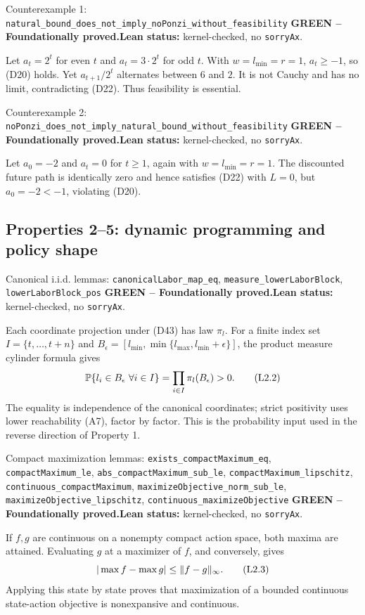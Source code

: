 \documentclass[11pt]{article}
\newcommand{\PP}{\mathbb P}
\newcommand{\leanname}[1]{\nolinkurl{#1}}
\newcommand{\eqL}[1]{\refstepcounter{equation}\tag{L#1}}
\newcommand{\formalcheck}{\textbf{Lean status:} kernel-checked, no \texttt{sorryAx}.}
\newcommand{\greenstatus}{\textcolor{proved}{\textbf{GREEN -- Foundationally proved.}}}
\begin{document}
\begin{greenbox}{Counterexample 1: \leanname{natural_bound_does_not_imply_noPonzi_without_feasibility}}
\greenstatus\quad\formalcheck

Let \(a_t=2^t\) for even \(t\) and \(a_t=3\cdot2^t\) for odd \(t\).  With
\(w=l_{\min}=r=1\), \(a_t\ge-1\), so (D20) holds.  Yet
\(a_{t+1}/2^t\) alternates between \(6\) and \(2\).  It is not Cauchy and has
no limit, contradicting (D22).  Thus feasibility is essential.
\end{greenbox}

\begin{greenbox}{Counterexample 2: \leanname{noPonzi_does_not_imply_natural_bound_without_feasibility}}
\greenstatus\quad\formalcheck

Let \(a_0=-2\) and \(a_t=0\) for \(t\ge1\), again with
\(w=l_{\min}=r=1\).  The discounted future path is identically zero and hence
satisfies (D22) with \(L=0\), but \(a_0=-2<-1\), violating (D20).
\end{greenbox}

\subsection{Properties 2--5: dynamic programming and policy shape}

\begin{greenbox}{Canonical i.i.d. lemmas: \leanname{canonicalLabor_map_eq},
\leanname{measure_lowerLaborBlock}, \leanname{lowerLaborBlock_pos}}
\greenstatus\quad\formalcheck

Each coordinate projection under (D43) has law \(\pi_l\).  For a finite index
set \(I=\{t,\ldots,t+n\}\) and
\(B_\epsilon=[l_{\min},\min\{l_{\max},l_{\min}+\epsilon\}]\), the product
measure cylinder formula gives
\begin{equation}
 \PP\{l_i\in B_\epsilon\ \forall i\in I\}
   =\prod_{i\in I}\pi_l(B_\epsilon)>0. \eqL{2.2}\label{L2.2}
\end{equation}
The equality is independence of the canonical coordinates; strict positivity
uses lower reachability (A7), factor by factor.  This is the probability
input used in the reverse direction of Property 1.
\end{greenbox}

\begin{greenbox}{Compact maximization lemmas:
\leanname{exists_compactMaximum_eq}, \leanname{compactMaximum_le},
\leanname{abs_compactMaximum_sub_le},
\leanname{compactMaximum_lipschitz},
\leanname{continuous_compactMaximum},
\leanname{maximizeObjective_norm_sub_le},
\leanname{maximizeObjective_lipschitz},
\leanname{continuous_maximizeObjective}}
\greenstatus\quad\formalcheck

If \(f,g\) are continuous on a nonempty compact action space, both maxima are
attained.  Evaluating \(g\) at a maximizer of \(f\), and conversely, gives
\begin{equation}
 |\max f-\max g|\le\|f-g\|_\infty. \eqL{2.3}\label{L2.3}
\end{equation}
Applying this state by state proves that maximization of a bounded continuous
state-action objective is nonexpansive and continuous.
\end{greenbox}
\end{document}
